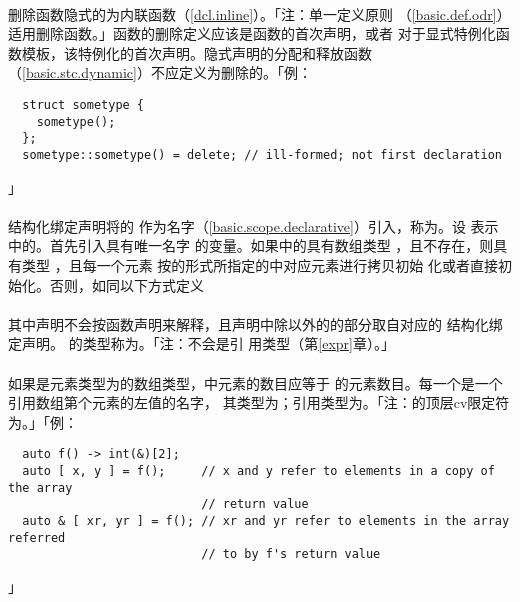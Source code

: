 \paragraph{}
删除函数隐式的为内联函数（\ref{dcl.inline}）。「注：单一定义原则
（\ref{basic.def.odr}）适用删除函数。」函数的删除定义应该是函数的首次声明，或者
对于显式特例化函数模板，该特例化的首次声明。隐式声明的分配和释放函数
（\ref{basic.stc.dynamic}）不应定义为删除的。「例：
\begin{lstlisting}
  struct sometype {
    sometype();
  };
  sometype::sometype() = delete; // ill-formed; not first declaration
\end{lstlisting}」

\paragraph{}
结构化绑定声明将的 作为名字（\ref{basic.scope.declarative}）引入，称为。设
表示中的。首先引入具有唯一名字
的变量。如果中的具有数组类型
，且不存在，则具有类型 ，且每一个元素
按的形式所指定的中对应元素进行拷贝初始
化或者直接初始化。否则，如同以下方式定义                                \\
\mbox{\qquad{}   \tm{;}}                   \\
其中声明不会按函数声明来解释，且声明中除以外的的部分取自对应的
结构化绑定声明。 的类型称为。「注：不会是引
用类型（第\ref{expr}章）。」

\paragraph{}
如果是元素类型为的数组类型，中元素的数目应等于
的元素数目。每一个是一个引用数组第个元素的左值的名字，
其类型为；引用类型为。「注：的顶层cv限定符为。」「例：
\begin{lstlisting}
  auto f() -> int(&)[2];
  auto [ x, y ] = f();     // x and y refer to elements in a copy of the array
                           // return value
  auto & [ xr, yr ] = f(); // xr and yr refer to elements in the array referred
                           // to by f's return value
\end{lstlisting}」

